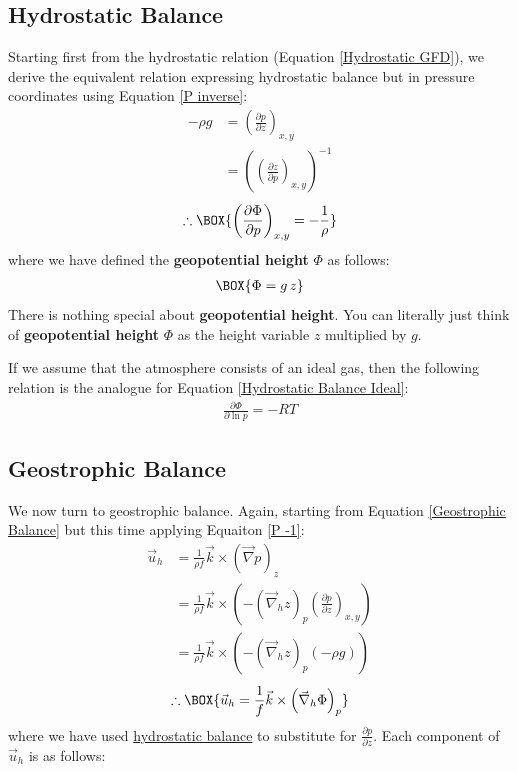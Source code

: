 \subsection{Hydrostatic Balance}

Starting first from the hydrostatic relation (Equation \ref{Hydrostatic GFD}), we derive the equivalent relation expressing hydrostatic balance but in pressure coordinates using Equation \ref{P inverse}:
\begin{align*}
    -\rho g &= \left( \frac{\partial p}{\partial z} \right)_{x,y}
    \\
    &=\left( \left( \frac{\partial z}{\partial p} \right)_{x,y} \right)^{-1}
\end{align*}
\begin{align}
    \label{Hydrostatic Pressure}
    \therefore \BOX{
        \left( \frac{\partial \Phi}{\partial p} \right)_{x,y}
        =-\frac{1}{\rho}
    }
\end{align}
where we have defined the \textbf{geopotential height} $\Phi$ as follows:
\begin{align}
    \BOX{\Phi =g\,z}
\end{align}
There is nothing special about \textbf{geopotential height}. You can literally just think of \textbf{geopotential height} $\Phi$ as the height variable $z$ multiplied by $g$. 

If we assume that the atmosphere consists of an ideal gas, then the following relation is the analogue for Equation \ref{Hydrostatic Balance Ideal}:
\begin{align}
    \boxed{\frac{\partial \Phi}{\partial \ln p}=-RT}
    \label{Hydrostatic Pressure Ideal}
\end{align}

\subsection{Geostrophic Balance}

We now turn to geostrophic balance. Again, starting from Equation \ref{Geostrophic Balance} but this time applying Equaiton \ref{P -1}:
\begin{align*}
    \vec{u}_h &= \frac{1}{\rho f}\vec{k}\times\left(\vec{\nabla}p\right)_z
    \\
    &=\frac{1}{\rho f}\vec{k}\times\left( 
        -\left( \vec{\nabla}_h z \right)_p \left( \frac{\partial p}{\partial z} \right)_{x,y}
     \right)
    \\
    &=\frac{1}{\rho f}\vec{k}\times\left( 
        -\left( \vec{\nabla}_h z \right)_p (-\rho g)
    \right)
\end{align*}
\begin{align}
    \label{Geostrophic Pressure}
    \therefore \BOX{
        \vec{u}_h = \frac{1}{f}\vec{k}\times\left( \vec{\nabla}_h \Phi \right)_p
    }
\end{align}
where we have used \hyperref[Hydrostatic GFD Box]{hydrostatic balance} to substitute for $\frac{\partial p}{\partial z}$. Each component of $\vec{u}_h$ is as follows:

